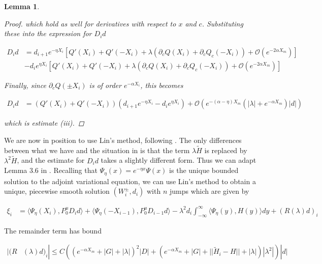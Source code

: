 \documentclass[12pt]{article}
\newtheorem{lemma}{Lemma}
\begin{document}
\begin{lemma}
\begin{proof}
which hold as well for derivatives with respect to $x$ and $c$. Substituting these into the expression for $D_i d$

\begin{align*}
D_i d &= d_{i+1} e^{-\eta X_i} \left[ Q'(X_i) + Q'(-X_i) + \lambda( \partial_c Q(X_i) + \partial_c Q_c(-X_i)) + \mathcal{O} \left( e^{-2 \alpha X_m} \right) \right] \\
&- d_i e^{\eta X_i} \left[ Q'(X_i) + Q'(-X_i) + \lambda( \partial_c Q(X_i) + \partial_c Q_c(-X_i)) + \mathcal{O} \left( e^{-2 \alpha X_m} \right) \right]
\end{align*}

Finally, since $\partial_c Q(\pm X_i)$ is of order $e^{-\alpha X_i}$, this becomes

\begin{align*}
D_i d &= ( Q'(X_i) + Q'(-X_i) )(d_{i+1} e^{-\eta X_i} - d_i e^{\eta X_i})
+ \mathcal{O} \left( e^{-(\alpha - \eta) X_m}\left( |\lambda| +  e^{-\alpha X_m} \right) |d| \right)
\end{align*}

which is estimate (iii).

\end{proof}
\end{lemma}

We are now in position to use Lin's method, following \cite{Sandstede1998}. The only differences between what we have and the situation in \cite{Sandstede1998} is that the term $\lambda \tilde{H}$ is replaced by $\lambda^2 \tilde{H}$, and the estimate for $D_i d$ takes a slightly different form. Thus we can adapt Lemma 3.6 in \cite{Sandstede1998}. Recalling that $\Psi_\eta(x) = e^{-\eta x}\Psi(x)$ is the unique bounded solution to the adjoint variational equation, we can use Lin's method to obtain a unique, piecewise smooth solution $(W_i^\pm, d_i)$ with $n$ jumps which are given by

\begin{align*}
\xi_i &= \langle \Psi_\eta(X_i), P_0^u D_i d \rangle
+ \langle \Psi_\eta(-X_{i-1}), P_0^u D_{i-1} d \rangle
- \lambda^2 d_i \int_{-\infty}^\infty \langle \Psi_\eta(y), H(y) \rangle dy
+ (R(\lambda)d)_i
\end{align*}

The remainder term has bound

\begin{align*}
|(R&(\lambda)d)_i| \leq C \left( (e^{-\alpha X_m} + |G| + |\lambda|)^2 |D| + (e^{-\alpha X_m} + |G| + ||\tilde{H}_i - H|| + |\lambda| )|\lambda^2| \right)|d|
\end{align*}
\end{document}
